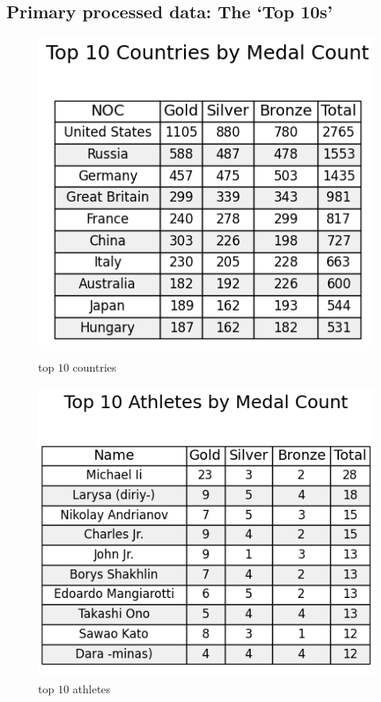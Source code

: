 \subsection*{Primary processed data: The `Top 10s'}

\begin{figure}[h]
    \centering
    \begin{minipage}{0.4\textwidth}
        \centering
        \includegraphics[width=\textwidth]{../figures/top_10_countries.png}
        \caption{top $10$ countries}
        \label{fig:top_10_countries}
    \end{minipage}\hfill
    \begin{minipage}{0.4\textwidth}
        \centering
        \includegraphics[width=\textwidth]{../figures/top_10_athletes.png}
        \caption{top $10$ athletes}
        \label{fig:top_10_athletes}
    \end{minipage}
\end{figure}